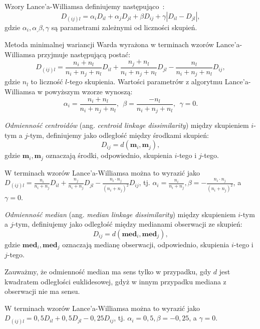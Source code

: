 \documentclass{praca1}
\begin{document}
\begin{definition}
Wzory Lance'a-Williamsa definiujemy następująco~\cite{Lance1967:hierarchical}:
$$
D_{(ij)l} = \alpha_i D_{il} + \alpha_j D_{jl} + \beta D_{ij} + \gamma |D_{il} - D_{jl}|,
$$
gdzie $\alpha_i, \alpha_, \beta, \gamma$ są parametrami zależnymi od liczności skupień.
\end{definition}

Metoda minimalnej wariancji Warda wyrażona w terminach wzorów Lance'a-Williamsa przyjmuje następującą postać:
$$
D_{(ij)l} = \frac{n_i+n_l}{n_i+n_j+n_l} D_{il} + \frac{n_j+n_l}{n_i+n_j+n_l} D_{jl} - \frac{n_l}{n_i+n_j+n_l} D_{ij},
$$
gdzie $n_l$ to liczność $l$-tego skupienia. Wartości parametrów z algorytmu Lance'a-Williamsa w powyższym wzorze wynoszą:
$$
\alpha_i =  \frac{n_i+n_l}{n_i+n_j+n_l},\ \ \beta = \frac{-n_l}{n_i+n_j+n_l},\ \ \gamma = 0.
$$

\begin{definition}
\emph{Odmienność centroidów} (ang. \emph{centroid linkage dissimilarity}) między skupieniem $i$-tym a $j$-tym, definiujemy jako odległość między środkami skupień:
$$
D_{ij} = d(\mathbf{m}_i, \mathbf{m}_j),
$$
gdzie $\mathbf{m}_i, \mathbf{m}_j$ oznaczają środki, odpowiednio, skupienia $i$-tego i $j$-tego.
\end{definition}

W terminach wzorów Lance'a-Williamsa można to wyrazić jako $D_{(ij)l} = \frac{n_i}{n_i + n_j} D_{il} + \frac{n_j}{n_i + n_j} D_{jl} - \frac{n_i \cdot n_j}{(n_i + n_j)^2} D_{ij} $, tj. $\alpha_i = \frac{n_i}{n_i + n_j}, \beta = - \frac{n_i \cdot n_j}{(n_i + n_j)^2}$, a $\gamma = 0$.

\begin{definition}
\emph{Odmienność median} (ang. \emph{median linkage dissimilarity}) między skupieniem $i$-tym a $j$-tym, definiujemy jako odległość między medianami obserwacji ze skupień:
$$
D_{ij} = d(\mathbf{med}_i, \mathbf{med}_j),
$$
gdzie $\mathbf{med}_i, \mathbf{med}_j$ oznaczają medianę obserwacji, odpowiednio, skupienia $i$-tego i $j$-tego.
\end{definition}

Zauważmy, że odmienność median ma sens tylko w przypadku, gdy $d$ jest kwadratem odległości euklidesowej, gdyż w innym przypadku mediana z obserwacji nie ma sensu.

W terminach wzorów Lance'a-Williamsa można to wyrazić jako $D_{(ij)l} = 0,5 D_{il} + 0,5 D_{jl} - 0,25 D_{ij} $, tj. $\alpha_i = 0,5, \beta = -0,25$, a $\gamma = 0$.
\end{document}
